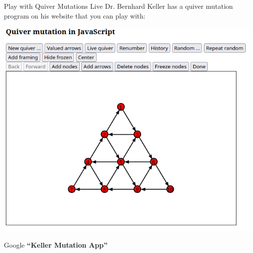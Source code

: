 \begin{frame}{Play with Quiver Mutations Live}
    Dr. Bernhard Keller has a quiver mutation program \cite{mutationapp} on his website that you can play with:
    \begin{center}
        \includegraphics[scale=0.3]{figures/bkeller_app.png}
    \end{center}
	Google \textbf{``Keller Mutation App''}
\end{frame}



